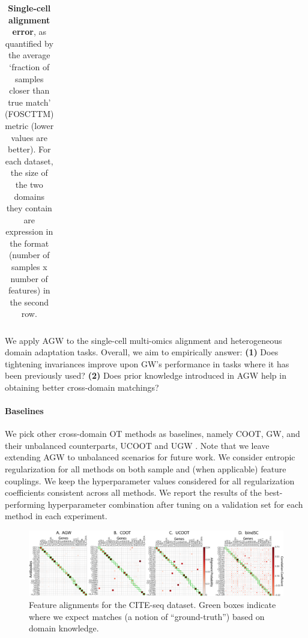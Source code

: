 \begin{table}[t]
\begin{center}
{\begin{tabular}{lccccccc}
\end{tabular}}
\end{center}
\caption{\label{table:scCells} \textbf{Single-cell alignment error},
as quantified by the average `fraction of samples closer than true match'
(FOSCTTM) metric (lower values are better).
For each dataset, the size of the two domains they contain are expression in the format
(number of samples x number of features) in the second row.
}
\end{table}

We apply AGW to the single-cell multi-omics alignment and heterogeneous domain adaptation tasks.
Overall, we aim to empirically answer:
\textbf{(1)} Does tightening invariances improve upon GW's performance in tasks where
it has been previously used? \textbf{(2)} Does prior knowledge introduced in AGW help
in obtaining better cross-domain matchings?

\paragraph{Baselines} We pick other cross-domain OT methods as baselines, namely COOT, GW,
and their unbalanced counterparts, UCOOT \citep{Tran23} and UGW \citep{Sejourne20}.
Note that we leave extending AGW to unbalanced scenarios for future work.
We consider entropic regularization for all methods on both sample and
(when applicable) feature couplings. We keep the hyperparameter values considered
for all regularization coefficients consistent across all methods. We report the results of
the best-performing hyperparameter combination after tuning on a validation set for each method
in each experiment.

\begin{figure}[t]
\centering
\includegraphics[width=\linewidth]{./Chapitre5/fig/cite_fgcoot_final.pdf}
\caption{\label{fig:cite} Feature alignments for the CITE-seq dataset. Green boxes indicate
where we expect matches (a notion of ``ground-truth'') based on domain knowledge.}
\end{figure}

